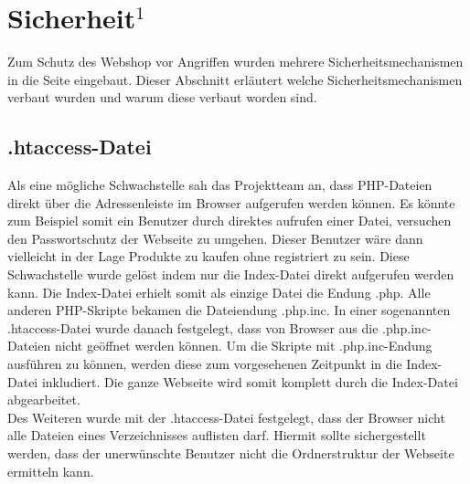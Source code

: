 \newpage
\section{Sicherheit$^1$}
Zum Schutz des Webshop vor Angriffen wurden mehrere Sicherheitsmechanismen in die Seite eingebaut. Dieser Abschnitt erläutert welche Sicherheitsmechanismen verbaut wurden und warum diese verbaut worden sind.

\subsection{\glqq .htaccess\grqq{}-Datei}
Als eine mögliche Schwachstelle sah das Projektteam an, dass PHP-Dateien direkt über die Adressenleiste im Browser aufgerufen werden können. Es könnte zum Beispiel somit ein Benutzer durch direktes aufrufen einer Datei, versuchen den Passwortschutz der Webseite zu umgehen. Dieser Benutzer wäre dann vielleicht in der Lage Produkte zu kaufen ohne registriert zu sein. Diese Schwachstelle wurde gelöst indem nur die Index-Datei direkt aufgerufen werden kann. Die Index-Datei erhielt somit als einzige Datei die Endung \glqq *.php\grqq{}. Alle anderen PHP-Skripte bekamen die Dateiendung \glqq *.php.inc\grqq{}. In einer sogenannten \glqq .htaccess\grqq{}-Datei wurde danach festgelegt, dass von Browser aus die \glqq *.php.inc\grqq{}-Dateien nicht geöffnet werden können. Um die Skripte mit \glqq *.php.inc\grqq{}-Endung ausführen zu können, werden diese zum vorgesehenen Zeitpunkt in die Index-Datei inkludiert. Die ganze Webseite wird somit komplett durch die Index-Datei abgearbeitet.\\
Des Weiteren wurde mit der \glqq .htaccess\grqq{}-Datei festgelegt, dass der Browser nicht alle Dateien eines Verzeichnisses auflisten darf. Hiermit sollte sichergestellt werden, dass der unerwünschte Benutzer nicht die Ordnerstruktur der Webseite ermitteln kann.

